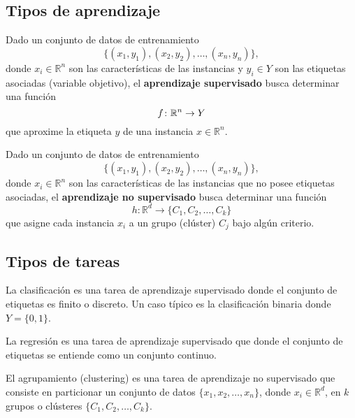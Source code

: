 \documentclass[a4,11pt]{aleph-notas}
\begin{document}
\subsection{Tipos de aprendizaje}

\begin{defi}
    Dado un conjunto de datos de entrenamiento 
    \[
        \{(x_1, y_1), (x_2, y_2), \dots, (x_n, y_n)\},
    \]
    donde $x_i \in \mathbb{R}^n$ son las características de las instancias y $y_i \in Y$ son las etiquetas asociadas (variable objetivo), el \textbf{aprendizaje supervisado} busca determinar una función 
    \[
        f\colon \mathbb{R}^n \rightarrow Y
    \]
    que aproxime la etiqueta $y$ de una instancia $x \in \mathbb{R}^n$.
\end{defi}

\begin{defi}
    Dado un conjunto de datos de entrenamiento 
    \[
        \{(x_1, y_1), (x_2, y_2), \dots, (x_n, y_n)\},
    \]
    donde $x_i \in \mathbb{R}^n$ son las características de las instancias que no posee etiquetas asociadas, el \textbf{aprendizaje no supervisado} busca determinar una función  
    \[
        h: \mathbb{R}^d \to \{C_1, C_2, \dots, C_k\}
    \]
    que asigne cada instancia $x_i$ a un grupo (clúster) $C_j$ bajo algún criterio.
\end{defi}


\subsection{Tipos de tareas}

\begin{defi}[Clasificación]
    La clasificación es una tarea de aprendizaje supervisado donde el conjunto de etiquetas es finito o discreto. Un caso típico es la clasificación binaria donde $Y = \{0, 1\}$.
\end{defi}

\begin{defi}[Regresión]
    La regresión es una tarea de aprendizaje supervisado que donde el conjunto de etiquetas se entiende como un conjunto continuo. 
\end{defi}

\begin{defi}[Agrupamiento]
    El agrupamiento (clustering) es una tarea de aprendizaje no supervisado que consiste en particionar un conjunto de datos $\{x_1, x_2, \dots, x_n\}$, donde $x_i \in \mathbb{R}^d$, en $k$ grupos o clústeres $\{C_1, C_2, \dots, C_k\}$.
\end{defi}
\end{document}
